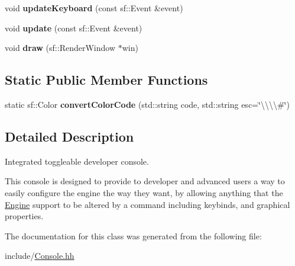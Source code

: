 \begin{DoxyCompactItemize}
\item 
void {\bfseries update\+Keyboard} (const sf\+::\+Event \&event)\hypertarget{classConsole_a5d3acb9de22bb5de6475431cb7dfa4e9}{}\label{classConsole_a5d3acb9de22bb5de6475431cb7dfa4e9}

\item 
void {\bfseries update} (const sf\+::\+Event \&event)\hypertarget{classConsole_aa5303865edd868a23c7cf77795bc9d4e}{}\label{classConsole_aa5303865edd868a23c7cf77795bc9d4e}

\item 
void {\bfseries draw} (sf\+::\+Render\+Window $\ast$win)\hypertarget{classConsole_a3521a7d331b2224e2034b079caeed4c2}{}\label{classConsole_a3521a7d331b2224e2034b079caeed4c2}

\end{DoxyCompactItemize}
\subsection*{Static Public Member Functions}
\begin{DoxyCompactItemize}
\item 
static sf\+::\+Color {\bfseries convert\+Color\+Code} (std\+::string code, std\+::string esc=\char`\"{}\textbackslash{}\textbackslash{}\textbackslash{}\textbackslash{}\#\char`\"{})\hypertarget{classConsole_a562839a9b9607484329523d4910b0cd6}{}\label{classConsole_a562839a9b9607484329523d4910b0cd6}

\end{DoxyCompactItemize}


\subsection{Detailed Description}
Integrated toggleable developer console. 

This console is designed to provide to developer and advanced users a way to easily configure the engine the way they want, by allowing anything that the \hyperlink{classEngine}{Engine} support to be altered by a command including keybinds, and graphical properties. 

The documentation for this class was generated from the following file\+:\begin{DoxyCompactItemize}
\item 
include/\hyperlink{Console_8hh}{Console.\+hh}\end{DoxyCompactItemize}
